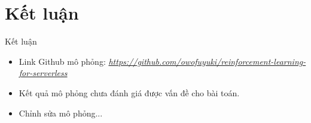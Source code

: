 \documentclass[10pt,aspectratio=169]{beamer}
\begin{document}
\section{Kết luận}

\begin{frame}{Kết luận}
\begin{itemize}
\setlength\itemsep{8pt}
\item Link Github mô phỏng: \textit{
\href{https://github.com/owofuyuki/reinforcement-learning-for-serverless}{https://github.com/owofuyuki/reinforcement-learning-for-serverless}}
\item Kết quả mô phỏng chưa đánh giá được vấn đề cho bài toán.
\item Chỉnh sửa mô phỏng...
\end{itemize}
\end{frame}

\backmatter
\end{document}
